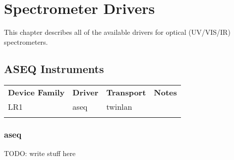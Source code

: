 \chapter{Spectrometer Drivers}
\label{sec:spec-drivers}

This chapter describes all of the available drivers for optical (UV/VIS/IR) spectrometers.

\section{ASEQ Instruments}

\begin{tabularx}{16cm}{lllX}
\thickhline
\textbf{Device Family} & \textbf{Driver} & \textbf{Transport} & \textbf{Notes} \\
\thickhline
LR1 & aseq & twinlan & \\
\thickhline
\end{tabularx}

\subsection{aseq}

TODO: write stuff here
